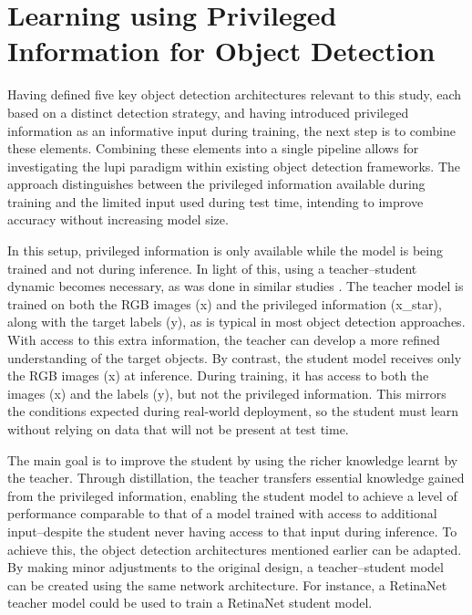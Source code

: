 
\section{Learning using Privileged Information for Object Detection}
\label{sec:4_lupi4od}

Having defined five key object detection architectures relevant to this study, each based on a distinct detection strategy, and having introduced privileged information as an informative input during training, the next step is to combine these elements. Combining these elements into a single pipeline allows for investigating the \gls{lupi} paradigm within existing object detection frameworks. The approach distinguishes between the privileged information available during training and the limited input used during test time, intending to improve accuracy without increasing model size.

In this setup, privileged information is only available while the model is being trained and not during inference. In light of this, using a teacher–student dynamic becomes necessary, as was done in similar studies \cite{lab2wild, lupi_classification}. The teacher model is trained on both the RGB images (\gls{x}) and the privileged information (\gls{x_star}), along with the target labels (\gls{y}), as is typical in most object detection approaches. With access to this extra information, the teacher can develop a more refined understanding of the target objects.
By contrast, the student model receives only the RGB images (\gls{x}) at inference. During training, it has access to both the images (\gls{x}) and the labels (\gls{y}), but not the privileged information. This mirrors the conditions expected during real-world deployment, so the student must learn without relying on data that will not be present at test time.

The main goal is to improve the student by using the richer knowledge learnt by the teacher. Through distillation, the teacher transfers essential knowledge gained from the privileged information, enabling the student model to achieve a level of performance comparable to that of a model trained with access to additional input--despite the student never having access to that input during inference.
To achieve this, the object detection architectures mentioned earlier can be adapted. By making minor adjustments to the original design, a teacher–student model can be created using the same network architecture. For instance, a RetinaNet teacher model could be used to train a RetinaNet student model.

